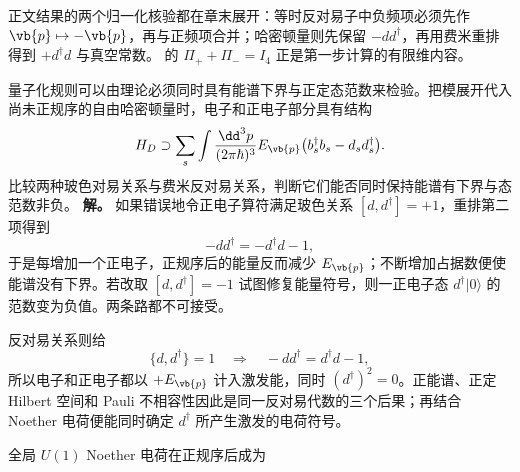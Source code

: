 正文结果的两个归一化核验都在章末展开：等时反对易子中负频项必须先作 $\vb{p}\mapsto-\vb{p}$，再与正频项合并；哈密顿量则先保留 $-d d^\dagger$，再用费米重排得到 $+d^\dagger d$ 与真空常数。 的 $\Pi_++\Pi_-=I_4$ 正是第一步计算的有限维内容。

\begin{exbox}
量子化规则可以由理论必须同时具有能谱下界与正定态范数来检验。把模展开代入尚未正规序的自由哈密顿量时，电子和正电子部分具有结构
\begin{equation*}
 H_D\supset
 \sum_s\int\frac{\dd^3 p}{(2\pi\hbar)^3}E_{\vb{p}}
 \bigl(b_s^\dagger b_s-d_s d_s^\dagger\bigr).
\end{equation*}
比较两种玻色对易关系与费米反对易关系，判断它们能否同时保持能谱有下界与态范数非负。
\textbf{解。} 如果错误地令正电子算符满足玻色关系 $[d,d^\dagger]=+1$，重排第二项得到
\begin{equation*}
 -d d^\dagger=-d^\dagger d-1,
\end{equation*}
于是每增加一个正电子，正规序后的能量反而减少 $E_{\vb{p}}$；不断增加占据数便使能谱没有下界。若改取 $[d,d^\dagger]=-1$ 试图修复能量符号，则一正电子态 $d^\dagger|0\rangle$ 的范数变为负值。两条路都不可接受。

反对易关系则给
\begin{equation*}
 \{d,d^\dagger\}=1
 \quad\Longrightarrow\quad
 -d d^\dagger=d^\dagger d-1,
\end{equation*}
所以电子和正电子都以 $+E_{\vb{p}}$ 计入激发能，同时 $(d^\dagger)^2=0$。正能谱、正定 Hilbert 空间和 Pauli 不相容性因此是同一反对易代数的三个后果；再结合 Noether 电荷便能同时确定 $d^\dagger$ 所产生激发的电荷符号。
\end{exbox}

全局 $U(1)$ Noether 电荷在正规序后成为


